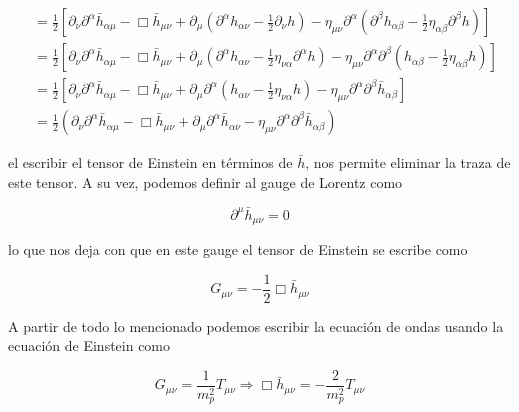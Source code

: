 \begin{equation}
\begin{split}
        &= \frac{1}{2} \left[ \partial_\nu \partial^\alpha \bar{h}_{\alpha \mu} - \Box \bar{h}_{\mu \nu} + \partial_\mu \left(\partial^\alpha h_{\alpha \nu} - \frac{1}{2} \partial_\nu h \right) - \eta_{\mu \nu} \partial^\alpha \left( \partial^\beta h_{\alpha \beta} - \frac{1}{2} \eta_{\alpha \beta} \partial^\beta h \right) \right]\\
        &= \frac{1}{2} \left[ \partial_\nu \partial^\alpha \bar{h}_{\alpha \mu} - \Box \bar{h}_{\mu \nu} + \partial_\mu \left( \partial^\alpha h_{\alpha \nu} - \frac{1}{2} \eta_{\nu \alpha} \partial^\alpha h \right) - \eta_{\mu \nu} \partial^\alpha \partial^\beta \left( h_{\alpha \beta} - \frac{1}{2} \eta_{\alpha \beta} h \right) \right]\\
        &= \frac{1}{2} \left[ \partial_\nu \partial^\alpha \bar{h}_{\alpha \mu} - \Box \bar{h}_{\mu \nu} + \partial_\mu \partial^\alpha \left( h_{\alpha \nu} - \frac{1}{2} \eta_{\nu \alpha} h \right) - \eta_{\mu \nu} \partial^\alpha \partial^\beta \bar{h}_{\alpha \beta} \right]\\
        &= \frac{1}{2} \left( \partial_\nu \partial^\alpha \bar{h}_{\alpha \mu} - \Box \bar{h}_{\mu \nu} + \partial_\mu \partial^\alpha \bar{h}_{\alpha \nu} - \eta_{\mu \nu} \partial^\alpha \partial^\beta \bar{h}_{\alpha \beta} \right)
    \end{split}
\end{equation}

\noindent
el escribir el tensor de Einstein en términos de $\bar{h}$, nos permite eliminar la traza de este tensor. A su vez, podemos definir al gauge de Lorentz como

\begin{equation}
    \partial^\mu \bar{h}_{\mu \nu} = 0
\end{equation}

\noindent
lo que nos deja con que en este gauge el tensor de Einstein se escribe como

\begin{equation}
    G_{\mu\nu} = - \frac{1}{2} \Box \bar{h}_{\mu \nu}
\end{equation}

A partir de todo lo mencionado podemos escribir la ecuación de ondas usando la ecuación de Einstein como

\begin{equation}
    G_{\mu \nu} = \frac{1}{m_p^2} T_{\mu \nu} \Rightarrow \boxed{\Box \bar{h}_{\mu \nu} = - \frac{2}{m_p^2} T_{\mu \nu}}
\end{equation}

